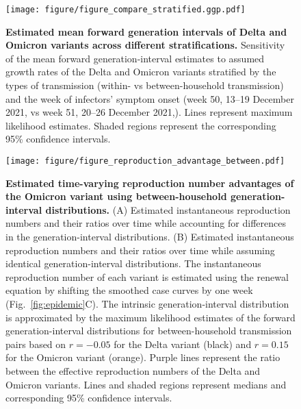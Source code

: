 \documentclass[12pt]{article}
\newcommand{\fref}[1]{Fig.~\ref{fig:#1}}
\begin{document}
\pagebreak

\begin{figure}[!th]
\texttt{[image: figure/figure\_compare\_stratified.ggp.pdf]}
\caption{
\textbf{Estimated mean forward generation intervals of Delta and Omicron variants across different stratifications.}
Sensitivity of the mean forward generation-interval estimates to assumed growth rates of the Delta and Omicron variants stratified by the types of transmission (within- vs between-household transmission) and the week of infectors' symptom onset (week 50, 13--19 December 2021, vs week 51, 20--26 December 2021,).
Lines represent maximum likelihood estimates.
Shaded regions represent the corresponding 95\% confidence intervals.
}
\end{figure}


\pagebreak

\begin{figure}[!th]
\texttt{[image: figure/figure\_reproduction\_advantage\_between.pdf]}
\caption{
\textbf{Estimated time-varying reproduction number advantages of the Omicron variant using between-household generation-interval distributions.}
(A) Estimated instantaneous reproduction numbers and their ratios over time while accounting for differences in the generation-interval distributions.
(B) Estimated instantaneous reproduction numbers and their ratios over time while assuming identical generation-interval distributions.
The instantaneous reproduction number of each variant is estimated using the renewal equation by shifting the smoothed case curves by one week (\fref{epidemic}C).
The intrinsic generation-interval distribution is approximated by the maximum likelihood estimates of the forward generation-interval distributions for between-household transmission pairs based on $r=-0.05$ for the Delta variant (black) and $r=0.15$ for the Omicron variant (orange).
Purple lines represent the ratio between the effective reproduction numbers of the Delta and Omicron variants.
Lines and shaded regions represent medians and corresponding 95\% confidence intervals.
}
\end{figure}

\pagebreak


\end{document}
